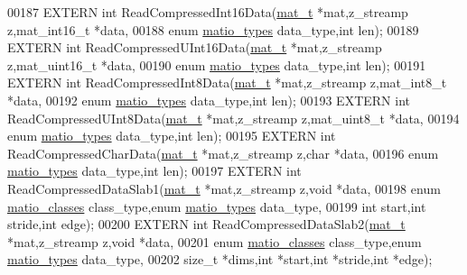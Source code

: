 \begin{DoxyCode}
00187 EXTERN \textcolor{keywordtype}{int} ReadCompressedInt16Data(\hyperlink{struct__mat__t}{mat\_t} *mat,z\_streamp z,mat\_int16\_t *data,
00188                \textcolor{keyword}{enum} \hyperlink{group___m_a_t_gacf7b3b879282b7ab3a51190e49bf3453}{matio\_types} data\_type,\textcolor{keywordtype}{int} len);
00189 EXTERN \textcolor{keywordtype}{int} ReadCompressedUInt16Data(\hyperlink{struct__mat__t}{mat\_t} *mat,z\_streamp z,mat\_uint16\_t *data,
00190                \textcolor{keyword}{enum} \hyperlink{group___m_a_t_gacf7b3b879282b7ab3a51190e49bf3453}{matio\_types} data\_type,\textcolor{keywordtype}{int} len);
00191 EXTERN \textcolor{keywordtype}{int} ReadCompressedInt8Data(\hyperlink{struct__mat__t}{mat\_t} *mat,z\_streamp z,mat\_int8\_t  *data,
00192                \textcolor{keyword}{enum} \hyperlink{group___m_a_t_gacf7b3b879282b7ab3a51190e49bf3453}{matio\_types} data\_type,\textcolor{keywordtype}{int} len);
00193 EXTERN \textcolor{keywordtype}{int} ReadCompressedUInt8Data(\hyperlink{struct__mat__t}{mat\_t} *mat,z\_streamp z,mat\_uint8\_t  *data,
00194                \textcolor{keyword}{enum} \hyperlink{group___m_a_t_gacf7b3b879282b7ab3a51190e49bf3453}{matio\_types} data\_type,\textcolor{keywordtype}{int} len);
00195 EXTERN \textcolor{keywordtype}{int} ReadCompressedCharData(\hyperlink{struct__mat__t}{mat\_t} *mat,z\_streamp z,\textcolor{keywordtype}{char} *data,
00196                \textcolor{keyword}{enum} \hyperlink{group___m_a_t_gacf7b3b879282b7ab3a51190e49bf3453}{matio\_types} data\_type,\textcolor{keywordtype}{int} len);
00197 EXTERN \textcolor{keywordtype}{int} ReadCompressedDataSlab1(\hyperlink{struct__mat__t}{mat\_t} *mat,z\_streamp z,\textcolor{keywordtype}{void} *data,
00198                \textcolor{keyword}{enum} \hyperlink{group___m_a_t_gad4d60ae7b709fc81bfd744fb4c857c40}{matio\_classes} class\_type,\textcolor{keyword}{enum} \hyperlink{group___m_a_t_gacf7b3b879282b7ab3a51190e49bf3453}{matio\_types} data\_type,
00199                \textcolor{keywordtype}{int} start,\textcolor{keywordtype}{int} stride,\textcolor{keywordtype}{int} edge);
00200 EXTERN \textcolor{keywordtype}{int} ReadCompressedDataSlab2(\hyperlink{struct__mat__t}{mat\_t} *mat,z\_streamp z,\textcolor{keywordtype}{void} *data,
00201                \textcolor{keyword}{enum} \hyperlink{group___m_a_t_gad4d60ae7b709fc81bfd744fb4c857c40}{matio\_classes} class\_type,\textcolor{keyword}{enum} \hyperlink{group___m_a_t_gacf7b3b879282b7ab3a51190e49bf3453}{matio\_types} data\_type,
00202                \textcolor{keywordtype}{size\_t} *dims,\textcolor{keywordtype}{int} *start,\textcolor{keywordtype}{int} *stride,\textcolor{keywordtype}{int} *edge);

\end{DoxyCode}
